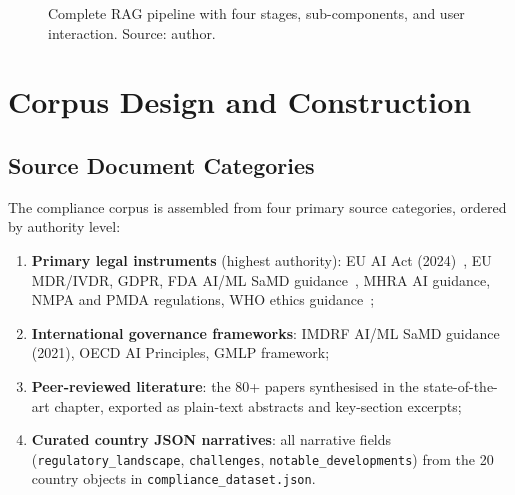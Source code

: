 \begin{figure}[htbp]
\caption{Complete RAG pipeline with four stages, sub-components, and user interaction.
  Source: author.}
\label{fig:rag-pipeline-full}
\end{figure}

\section{Corpus Design and Construction}
\label{sec:rag-corpus-full}

\subsection{Source Document Categories}
\label{sec:rag-sources}

The compliance corpus is assembled from four primary source categories, ordered by
authority level:

\begin{enumerate}[noitemsep]
  \item \textbf{Primary legal instruments} (highest authority): EU AI Act
        (2024)~\cite{euaiact2024}, EU MDR/IVDR, GDPR, FDA AI/ML SaMD
        guidance~\cite{fda2021}, MHRA AI guidance, NMPA and PMDA regulations,
        WHO ethics guidance~\cite{who2021};
  \item \textbf{International governance frameworks}: IMDRF AI/ML SaMD guidance
        (2021), OECD AI Principles, GMLP framework;
  \item \textbf{Peer-reviewed literature}: the 80+ papers synthesised in the
        state-of-the-art chapter, exported as plain-text abstracts and key-section
        excerpts;
  \item \textbf{Curated country JSON narratives}: all narrative fields
        (\texttt{regulatory\_landscape}, \texttt{challenges},
        \texttt{notable\_developments}) from the 20 country objects in
        \texttt{compliance\_dataset.json}.
\end{enumerate}

